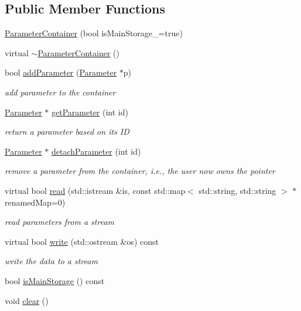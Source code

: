 \subsection*{Public Member Functions}
\begin{DoxyCompactItemize}
\item 
\hyperlink{classg2o_1_1ParameterContainer_a6047d0206008b5cbb366be0fe03246b4}{Parameter\+Container} (bool is\+Main\+Storage\+\_\+=true)
\item 
virtual \hyperlink{classg2o_1_1ParameterContainer_a186660e1ef0350798a549b247365b295}{$\sim$\+Parameter\+Container} ()
\item 
bool \hyperlink{classg2o_1_1ParameterContainer_a9c0b1376e780b177f2d36c4ee4f873d7}{add\+Parameter} (\hyperlink{classg2o_1_1Parameter}{Parameter} $\ast$p)
\begin{DoxyCompactList}\small\item\em add parameter to the container \end{DoxyCompactList}\item 
\hyperlink{classg2o_1_1Parameter}{Parameter} $\ast$ \hyperlink{classg2o_1_1ParameterContainer_ad55d9e6d2adaa4680f74be98e2ae3784}{get\+Parameter} (int id)
\begin{DoxyCompactList}\small\item\em return a parameter based on its ID \end{DoxyCompactList}\item 
\hyperlink{classg2o_1_1Parameter}{Parameter} $\ast$ \hyperlink{classg2o_1_1ParameterContainer_a6e57cf684d92f0ceeba8b4923fa41864}{detach\+Parameter} (int id)
\begin{DoxyCompactList}\small\item\em remove a parameter from the container, i.\+e., the user now owns the pointer \end{DoxyCompactList}\item 
virtual bool \hyperlink{classg2o_1_1ParameterContainer_ae5883ac8e2313cab310cf067b0ba12bf}{read} (std\+::istream \&is, const std\+::map$<$ std\+::string, std\+::string $>$ $\ast$renamed\+Map=0)
\begin{DoxyCompactList}\small\item\em read parameters from a stream \end{DoxyCompactList}\item 
virtual bool \hyperlink{classg2o_1_1ParameterContainer_addceeb97b3d737610e79142657c54851}{write} (std\+::ostream \&os) const 
\begin{DoxyCompactList}\small\item\em write the data to a stream \end{DoxyCompactList}\item 
bool \hyperlink{classg2o_1_1ParameterContainer_abfea723a17d417e6411bbd0c9fa50294}{is\+Main\+Storage} () const 
\item 
void \hyperlink{classg2o_1_1ParameterContainer_aff4d3792e2ebd022ebd4a1534b88b773}{clear} ()
\end{DoxyCompactItemize}
